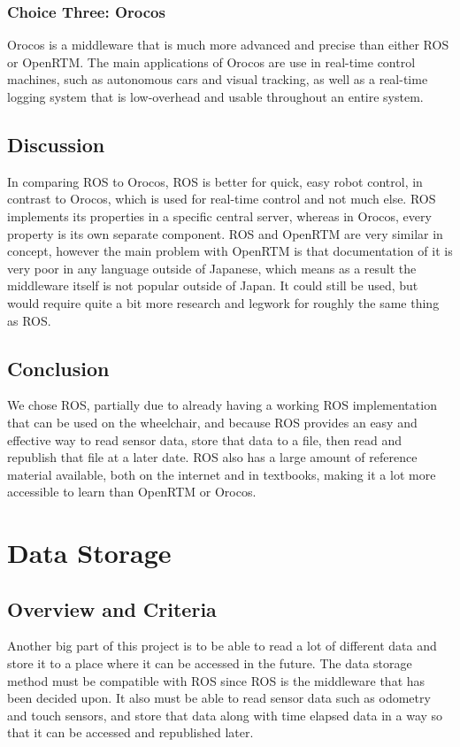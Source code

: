 \documentclass[onecolumn, draftclsnofoot,10pt, compsoc]{report}
\begin{document}
\subsubsection{Choice Three: Orocos}
Orocos is a middleware that is much more advanced and precise than either ROS or OpenRTM. The main applications of Orocos are use in real-time control machines, such as autonomous cars and visual tracking, as well as a real-time logging system that is low-overhead and usable throughout an entire system.\cite{Orocos_Roadmap}

\subsection{Discussion}
In comparing ROS to Orocos, ROS is better for quick, easy robot control, in contrast to Orocos, which is used for real-time control and not much else. ROS implements its properties in a specific central server, whereas in Orocos, every property is its own separate component.\cite{Orocos_And_ROS} ROS and OpenRTM are very similar in concept, however the main problem with OpenRTM is that documentation of it is very poor in any language outside of Japanese, which means as a result the middleware itself is not popular outside of Japan. It could still be used, but would require quite a bit more research and legwork for roughly the same thing as ROS.\cite{Robot_Middleware}

\subsection{Conclusion}
We chose ROS, partially due to already having a working ROS implementation that can be used on the wheelchair, and because ROS provides an easy and effective way to read sensor data, store that data to a file, then read and republish that file at a later date. ROS also has a large amount of reference material available, both on the internet and in textbooks, making it a lot more accessible to learn than OpenRTM or Orocos.

\section{Data Storage}
\subsection{Overview and Criteria}
Another big part of this project is to be able to read a lot of different data and store it to a place where it can be accessed in the future. The data storage method must be compatible with ROS since ROS is the middleware that has been decided upon. It also must be able to read sensor data such as odometry and touch sensors, and store that data along with time elapsed data in a way so that it can be accessed and republished later.
\end{document}
